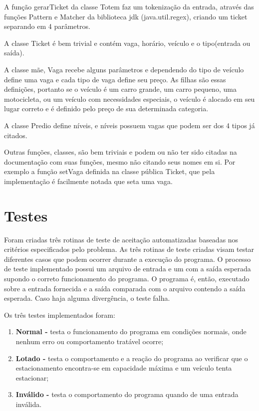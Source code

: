 \documentclass[a4paper,12pt]{article}
\begin{document}
A função gerarTicket da classe Totem faz um tokenização da entrada, através das funções Pattern e Matcher da biblioteca jdk (java.util.regex), criando um ticket separando em 4 parâmetros.

A classe Ticket é bem trivial e contém vaga, horário, veículo e o tipo(entrada ou saída).

A classe mãe, Vaga recebe alguns parâmetros e dependendo do tipo de veículo define uma vaga e cada tipo de vaga define seu preço. As filhas são essas definições, portanto se o veículo é um carro grande, um carro pequeno, uma motocicleta, ou um veículo com necessidades especiais, o veículo é alocado em seu lugar correto e é definido pelo preço de sua determinada categoria.

A classe Predio define níveis, e níveis possuem vagas que podem ser dos 4 tipos já citados.

Outras funções, classes, são bem triviais e podem ou não ter sido citadas na documentação com suas funções, mesmo não citando seus nomes em si. Por exemplo a função setVaga definida na classe pública Ticket, que pela implementação é facilmente notada que seta uma vaga. 


\section{Testes}

Foram criadas três rotinas de teste de aceitação automatizadas baseadas nos critérios especificados pelo problema. As três rotinas de teste criadas visam testar diferentes casos que podem ocorrer durante a execução do programa. O processo de teste implementado possui um arquivo de entrada e um com a saída esperada supondo o correto funcionamento do programa. O programa é, então, executado sobre a entrada fornecida e a saída comparada com o arquivo contendo a saída esperada. Caso haja alguma divergência, o teste falha.

Os três testes implementados foram:
\begin{enumerate}
    \item \textbf{Normal -} testa o funcionamento do programa em condições normais, onde nenhum erro ou comportamento tratável ocorre;
    \item \textbf{Lotado -} testa o comportamento e a reação do programa ao verificar que o estacionamento encontra-se em capacidade máxima e um veículo tenta estacionar;
    \item \textbf{Inválido -} testa o comportamento do programa quando de uma entrada inválida.
\end{enumerate}
\end{document}
